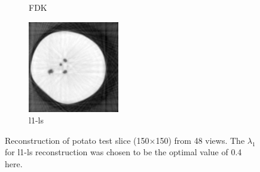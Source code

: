 \documentclass{article}
\begin{document}
\begin{figure}[!h]
\begin{subfigure}[b]{0.3\linewidth}
        \caption{FDK}
    \end{subfigure}
    \begin{subfigure}[b]{0.3\linewidth}
        \includegraphics[width=\textwidth]{../images/potato/2D/cs_blurred_results/48_views/result_CS_lambda0_0.40.png}
        \caption{l1-ls}
    \end{subfigure}
     \caption{Reconstruction of potato test slice (150$\times$150) from 48 views. The $\lambda_1$ for l1-ls reconstruction was chosen to be the optimal value of 0.4 here.} 
\label{fig:cs_blurred_48_views}
\end{figure}
\end{document}
